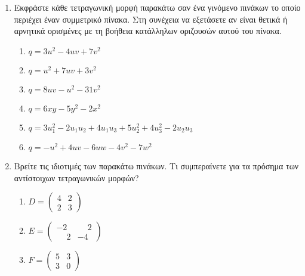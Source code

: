 \documentclass[a4paper,table]{report}
\begin{document}
\begin{center}
  \minibox{\large \bfseries \textcolor{Col1}{Ασκήσεις στις Τετραγωνικές Μορφές}}
\end{center}

\vspace{\baselineskip}


\begin{enumerate}

\item Εκφράστε κάθε τετραγωνική μορφή παρακάτω σαν ένα γινόμενο πινάκων το οποίο περιέχει
  έναν \textcolor{Col1}{συμμετρικό} πίνακα. Στη συνέχεια να εξετάσετε αν είναι θετικά ή 
  αρνητικά ορισμένες με τη βοήθεια κατάλληλων οριζουσών αυτού του πίνακα.

\begin{enumerate}
\item $q=3u^2-4uv+7v^2$
\item $q=u^2+7uv+3v^2$
\item $q=8uv-u^2-31v^2$
\item $q=6xy-5y^2-2x^2$
\item $q=3u_1^2-2u_1u_2+4u_1u_3+5u_2^2+4u_3^2-2u_2u_3$
\item $q=-u^2+4uv-6uw-4v^2-7w^2$
\end{enumerate}

\item Βρείτε τις ιδιοτιμές των παρακάτω πινάκων. Τι συμπεραίνετε για τα πρόσημα των αντίστοιχων τετραγωνικών μορφών?

\begin{enumerate}
\item $D=
\begin{pmatrix}
4 & 2\\
2 & 3
\end{pmatrix}$
\item $E=
\begin{pmatrix}
-2 & \phantom{-}2\\
\phantom{-}2 & -4
\end{pmatrix}$
\item $F=
\begin{pmatrix}
5 & 3\\
3 & 0
\end{pmatrix}$

\end{enumerate}


\end{enumerate}
\end{document}
